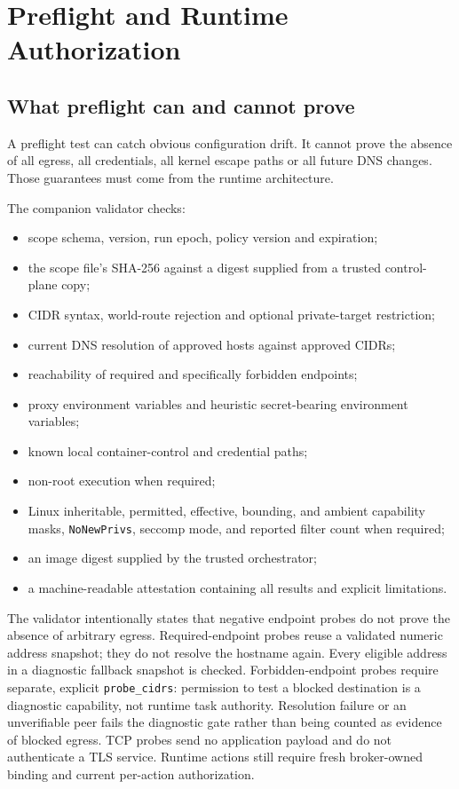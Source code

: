 \documentclass[11pt,letterpaper]{article}
\newcommand{\code}[1]{\texttt{#1}}
\begin{document}
\section{Preflight and Runtime Authorization}
\subsection{What preflight can and cannot prove}
A preflight test can catch obvious configuration drift. It cannot prove the absence of all egress, all credentials, all kernel escape paths or all future DNS changes. Those guarantees must come from the runtime architecture.

The companion validator checks:
\begin{itemize}
  \item scope schema, version, run epoch, policy version and expiration;
  \item the scope file's SHA-256 against a digest supplied from a trusted control-plane copy;
  \item CIDR syntax, world-route rejection and optional private-target restriction;
  \item current DNS resolution of approved hosts against approved CIDRs;
  \item reachability of required and specifically forbidden endpoints;
  \item proxy environment variables and heuristic secret-bearing environment variables;
  \item known local container-control and credential paths;
  \item non-root execution when required;
  \item Linux inheritable, permitted, effective, bounding, and ambient capability masks, \code{NoNewPrivs}, seccomp mode, and reported filter count when required;
  \item an image digest supplied by the trusted orchestrator;
  \item a machine-readable attestation containing all results and explicit limitations.
\end{itemize}

The validator intentionally states that negative endpoint probes do not prove the absence of arbitrary egress. Required-endpoint probes reuse a validated numeric address snapshot; they do not resolve the hostname again. Every eligible address in a diagnostic fallback snapshot is checked. Forbidden-endpoint probes require separate, explicit \code{probe\_cidrs}: permission to test a blocked destination is a diagnostic capability, not runtime task authority. Resolution failure or an unverifiable peer fails the diagnostic gate rather than being counted as evidence of blocked egress. TCP probes send no application payload and do not authenticate a TLS service. Runtime actions still require fresh broker-owned binding and current per-action authorization.
\end{document}
